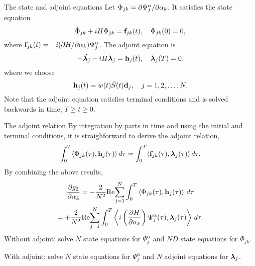 \documentclass{beamer}
\begin{document}
\begin{frame}{The state and adjoint equations}
 Let $\Phi_{jk} = \partial \Psi_j^\alpha / \partial \alpha_k$. It satisfies the state equation
 \[
 \dot{\Phi}_{jk} + i H \Phi_{jk} = {\bf f}_{jk}(t), \quad \Phi_{jk}(0) = 0,
  \]
  where ${\bf f}_{jk}(t) = -i(\partial H / \partial \alpha_k) \Psi_j^{\alpha}$. The adjoint equation is
  \[
  - \dot{\boldsymbol{\lambda}_j} - i H \boldsymbol{\lambda}_j = {\bf h}_j(t),\quad \boldsymbol{\lambda}_j(T) = 0.
  \]
  where we choose
  \[
  {\bf h}_j(t) = w(t) \bar{S}(t) {\bf d}_j,\quad j=1,2,\ldots,N.
  \]
  Note that the adjoint equation satisfies terminal conditions and is solved backwards in time,
  $T\geq t \geq 0$.

\end{frame}

\begin{frame}{The adjoint relation}
By integration by parts in time and using the initial and terminal conditions, it is straighforward
to derive the adjoint relation,
\[
\int_0^T \langle \Phi_{jk}(\tau), {\bf h}_j(\tau) \rangle\, d\tau =
\int_0^T \langle {\bf f}_{jk}(\tau), \boldsymbol{\lambda}_j(\tau) \rangle\, d\tau.
\]
By combining the above results,
\begin{multline*}
  \frac{\partial g_2}{\partial \alpha_k} 
  = -\frac{2}{N^2} {\rm Re\!} \sum_{j=1}^{N}  \int_0^T  \left\langle
  \Phi_{jk}(\tau),  {\bf h}_j(\tau) \right\rangle \, d\tau  \\
  = +\frac{2}{N^2} {\rm Re\!} \sum_{j=1}^{N}  \int_0^T  \left\langle
  i\left(\frac{\partial H}{\partial \alpha_k}\right) \Psi_j^{\alpha}(\tau), \boldsymbol{\lambda}_j(\tau) \right\rangle \, d\tau.
\end{multline*}
Without adjoint: solve $N$ state equations for $\Psi_j^\alpha$ and $N D$ state equations for $\Phi_{jk}$.

With adjoint: solve $N$ state equations for $\Psi_j^\alpha$ and $N$ adjoint equations for $\boldsymbol{\lambda}_j$. 

\end{frame}
\end{document}

